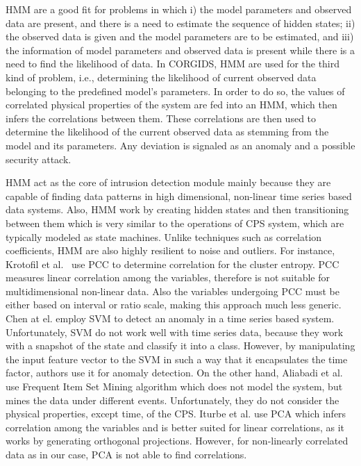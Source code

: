 \ac{HMM} are a good fit for problems in which i) the model parameters and observed data are present, and there is a need to estimate the sequence of hidden states; ii) the observed data is given and the model parameters are to be estimated, and iii) the information of model parameters and observed data is present while there is a need to find the likelihood of data. In \ac{CORGIDS}, \ac{HMM} are used for the third kind of problem, i.e., determining the likelihood of current observed data belonging to the predefined model's parameters. In order to do so, the values of correlated physical properties of the system are fed into an \ac{HMM}, which then infers the correlations between them. These correlations are then used to determine the likelihood of the current observed data as stemming from the model and its parameters. Any deviation is signaled as an anomaly and a possible security attack.

\ac{HMM} act as the core of intrusion detection module mainly because they are capable of finding data patterns in high dimensional, non-linear time series based data systems. Also, \ac{HMM} work by creating hidden states and then transitioning between them which is very similar to the operations of \ac{CPS} system, which are typically modeled as state machines.
Unlike techniques such as correlation coefficients, \ac{HMM} are also highly resilient to noise and outliers. 
For instance, Krotofil et al.~\cite{krotofil2015process} use \acf{PCC} to determine correlation for the cluster entropy. \ac{PCC} measures linear correlation among the variables, therefore is not suitable for multidimensional non-linear data. Also the variables undergoing \ac{PCC} must be either based on interval or ratio scale, making this approach much less generic. Chen at el.  \cite{chen2018learning} employ \ac{SVM} to detect an anomaly in a time series based system. Unfortunately, \ac{SVM} do not work well with time series data, because they work with a snapshot of the state and classify it into a class. However, by manipulating the input feature vector to the \ac{SVM} in such a way that it encapsulates the time factor, authors use it for anomaly detection. On the other hand, Aliabadi et al. ~\cite{aliabadi2017artinali} use Frequent Item Set Mining algorithm which does not model the system, but mines the data under different events. Unfortunately, they do not consider the physical properties, except time, of the \ac{CPS}. Iturbe et al. \cite{iturbe2017feasibility} use \ac{PCA} which infers correlation among the variables and is better suited for linear correlations, as it works by generating orthogonal projections. However, for non-linearly correlated data as in our case, \ac{PCA} is not able to find correlations.


